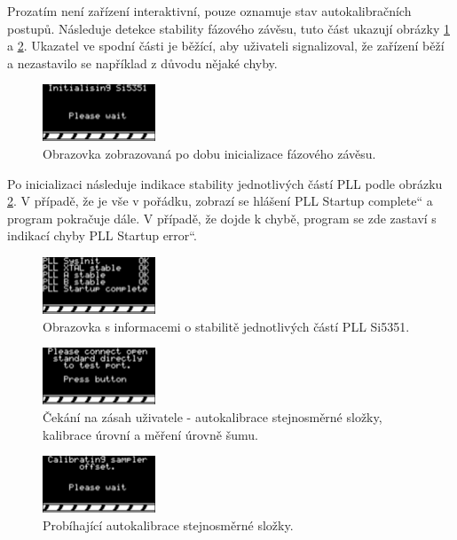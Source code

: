 Prozatím není zařízení interaktivní, pouze oznamuje stav autokalibračních postupů. Následuje detekce stability fázového závěsu, tuto část ukazují obrázky \ref{init_5351} a \ref{stability_5351}. Ukazatel ve spodní části je běžící, aby uživateli signalizoval, že zařízení běží a nezastavilo se například z důvodu nějaké chyby.

\begin{figure}[H]
\includegraphics[width=0.3\textwidth,keepaspectratio,interpolate=false]{images/init_5351.png}\caption{Obrazovka zobrazovaná po dobu inicializace fázového závěsu.}\label{init_5351}
\end{figure}

Po inicializaci následuje indikace stability jednotlivých částí PLL podle obrázku \ref{stability_5351}. V případě, že je vše v pořádku, zobrazí se hlášení \quotedblbase PLL Startup complete\textquotedblleft{} a program pokračuje dále. V případě, že dojde k chybě, program se zde zastaví s indikací chyby \quotedblbase PLL Startup error\textquotedblleft. 

\begin{figure}[H]
\includegraphics[width=0.3\textwidth,keepaspectratio,interpolate=false]{images/stability_5351.png}\caption{Obrazovka s informacemi o stabilitě jednotlivých částí PLL Si5351.}\label{stability_5351}
\end{figure}

\begin{figure}[H]
\includegraphics[width=0.3\textwidth,keepaspectratio,interpolate=false]{images/offset_user_wait.png}\caption{Čekání na zásah uživatele - autokalibrace stejnosměrné složky, kalibrace úrovní a měření úrovně šumu.}\label{offset_user_wait}
\end{figure}

\begin{figure}[H]
\includegraphics[width=0.3\textwidth,keepaspectratio,interpolate=false]{images/offset_wait.png}\caption{Probíhající autokalibrace stejnosměrné složky.}\label{offset_wait}
\end{figure}

